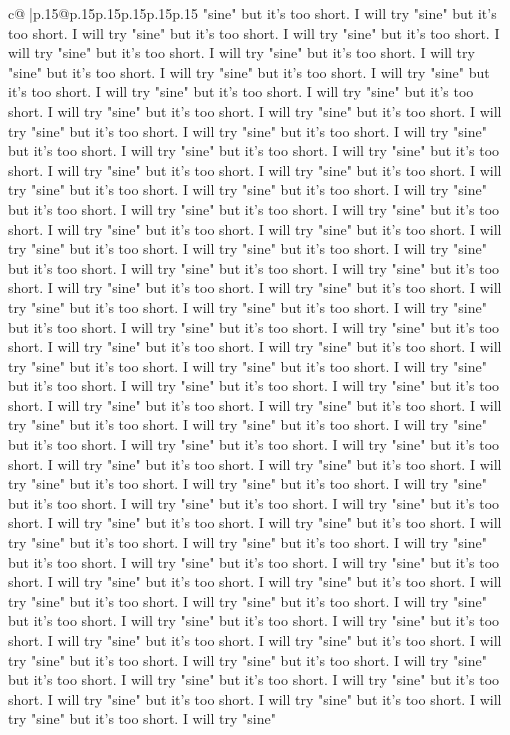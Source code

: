 \documentclass{article}
\begin{document}
{\begin{supertabular}{c@{$\;$}|p{.15\linewidth}@{}p{.15\linewidth}p{.15\linewidth}p{.15\linewidth}p{.15\linewidth}p{.15\linewidth}}
{{{"sine" but it's too short. I will try "sine" but it's too short. I will try "sine" but it's too short. I will try "sine" but it's too short. I will try "sine" but it's too short. I will try "sine" but it's too short. I will try "sine" but it's too short. I will try "sine" but it's too short. I will try "sine" but it's too short. I will try "sine" but it's too short. I will try "sine" but it's too short. I will try "sine" but it's too short. I will try "sine" but it's too short. I will try "sine" but it's too short. I will try "sine" but it's too short. I will try "sine" but it's too short. I will try "sine" but it's too short. I will try "sine" but it's too short. I will try "sine" but it's too short. I will try "sine" but it's too short. I will try "sine" but it's too short. I will try "sine" but it's too short. I will try "sine" but it's too short. I will try "sine" but it's too short. I will try "sine" but it's too short. I will try "sine" but it's too short. I will try "sine" but it's too short. I will try "sine" but it's too short. I will try "sine" but it's too short. I will try "sine" but it's too short. I will try "sine" but it's too short. I will try "sine" but it's too short. I will try "sine" but it's too short. I will try "sine" but it's too short. I will try "sine" but it's too short. I will try "sine" but it's too short. I will try "sine" but it's too short. I will try "sine" but it's too short. I will try "sine" but it's too short. I will try "sine" but it's too short. I will try "sine" but it's too short. I will try "sine" but it's too short. I will try "sine" but it's too short. I will try "sine" but it's too short. I will try "sine" but it's too short. I will try "sine" but it's too short. I will try "sine" but it's too short. I will try "sine" but it's too short. I will try "sine" but it's too short. I will try "sine" but it's too short. I will try "sine" but it's too short. I will try "sine" but it's too short. I will try "sine" but it's too short. I will try "sine" but it's too short. I will try "sine" but it's too short. I will try "sine" but it's too short. I will try "sine" but it's too short. I will try "sine" but it's too short. I will try "sine" but it's too short. I will try "sine" but it's too short. I will try "sine" but it's too short. I will try "sine" but it's too short. I will try "sine" but it's too short. I will try "sine" but it's too short. I will try "sine" but it's too short. I will try "sine" but it's too short. I will try "sine" but it's too short. I will try "sine" but it's too short. I will try "sine" but it's too short. I will try "sine" but it's too short. I will try "sine" but it's too short. I will try "sine" but it's too short. I will try "sine" but it's too short. I will try "sine" but it's too short. I will try "sine" but it's too short. I will try "sine" but it's too short. I will try "sine" but it's too short. I will try "sine" but it's too short. I will try "sine" but it's too short. I will try "sine" but it's too short. I will try "sine" but it's too short. I will try "sine" but it's too short. I will try "sine" but it's too short. I will try "sine" but it's too short. I will try "sine" }}}
\end{supertabular}}
\end{document}
